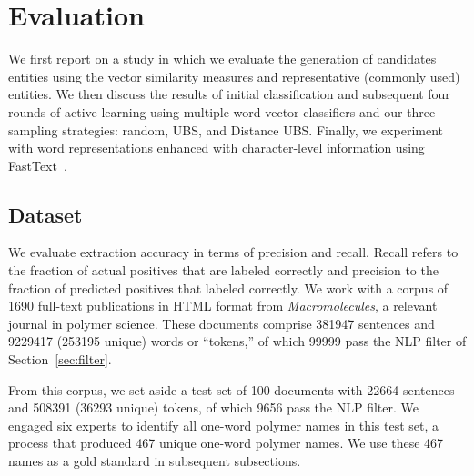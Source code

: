\section{Evaluation}
\label{sect:apner_results}
We first report on a study in which we evaluate the generation of candidates entities using the vector similarity measures and representative (commonly used) entities. 
We then discuss the results of initial classification and subsequent four rounds of active learning using multiple word vector classifiers and our three sampling strategies: random, UBS, and Distance UBS.
Finally, we experiment with word representations enhanced with character-level information using FastText~\cite{bojanowski2016enriching,joulin2016bag}.

\subsection{Dataset}
We evaluate extraction accuracy in terms of precision and recall.
Recall refers to the fraction of actual positives that
are labeled correctly and precision to the fraction of predicted
positives that labeled correctly.
We work with a corpus of \num{1690} full-text publications in HTML format from \textit{Macromolecules}, 
a relevant journal in polymer science.
These documents comprise \num{381947} sentences and \num{9229417} (\num{253195} unique) words or ``tokens,''
of which \num{99999} pass the NLP filter of Section~\ref{sec:filter}.

From this corpus, 
we set aside a test set of 100 documents with  \num{22664} sentences and \num{508391} (\num{36293} unique) tokens,
of which \num{9656} pass the NLP filter.
We engaged six experts to identify all one-word polymer names in this test set,
a process that produced 467 unique one-word polymer names.
We use these 467 names as a gold standard in subsequent subsections.


